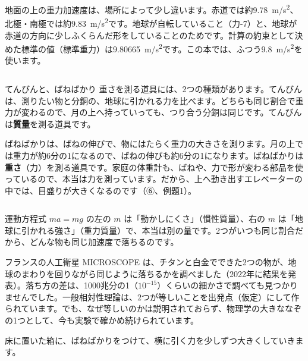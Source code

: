\begin{seikaku}
地面の上の重力加速度は、場所によって少し違います。赤道では約\qty{9.78}{m/s^2}、北極・南極では約\qty{9.83}{m/s^2}です。地球が自転していること（力-7）と、地球が赤道の方向に少しふくらんだ形をしていることのためです。計算の約束として決めた標準の値（標準重力）は\qty{9.80665}{m/s^2}です。この本では、ふつう\qty{9.8}{m/s^2}を使います。
\end{seikaku}

\begin{column}{てんびんと、ばねばかり}
重さを測る道具には、2つの種類があります。てんびんは、測りたい物と分銅の、地球に引かれる力を比べます。どちらも同じ割合で重力が変わるので、月の上へ持っていっても、つり合う分銅は同じです。てんびんは\textbf{質量}を測る道具です。

ばねばかりは、ばねの伸びで、物にはたらく重力の大きさを測ります。月の上では重力が約6分の1になるので、ばねの伸びも約6分の1になります。ばねばかりは\textbf{重さ}（力）を測る道具です。家庭の体重計も、ばねや、力で形が変わる部品を使っているので、本当は力を測っています。だから、上へ動き出すエレベーターの中では、目盛りが大きくなるのです（⑥、例題1）。
\end{column}

\begin{phmada}[重さと動かしにくさが等しいなぞ]
運動方程式 $ma=mg$ の左の $m$ は「動かしにくさ」（慣性質量）、右の $m$ は「地球に引かれる強さ」（重力質量）で、本当は別の量です。2つがいつも同じ割合だから、どんな物も同じ加速度で落ちるのです。

フランスの人工衛星 MICROSCOPE は、チタンと白金でできた2つの物が、地球のまわりを回りながら同じように落ちるかを調べました（2022年に結果を発表）。落ち方の差は、1000兆分の1（$10^{-15}$）くらいの細かさで調べても見つかりませんでした。一般相対性理論は、2つが等しいことを出発点（仮定）にして作られています。でも、なぜ等しいのかは説明されておらず、物理学の大きななぞの1つとして、今も実験で確かめ続けられています。
\end{phmada}




\leavevmode\label{ph:力-2:sec4}床に置いた箱に、ばねばかりをつけて、横に引く力を少しずつ大きくしていきます。

